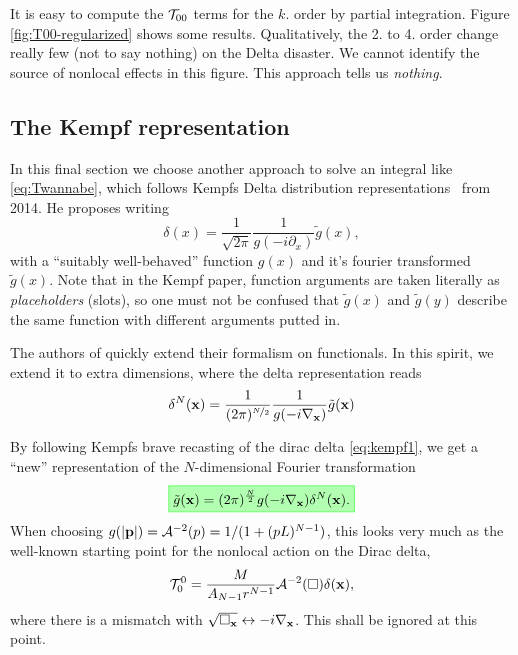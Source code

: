 \documentclass[10pt,a4paper]{article}
\newcommand{\highlight}[1]{%
   \fcolorbox{green}{green!30}{$\displaystyle#1$}%
}
\begin{document}
It is easy to compute the ${\cal T}_{00}$ terms for the $k$. order by partial integration. Figure \ref{fig:T00-regularized} shows some results. Qualitatively, the 2. to 4. order change really few (not to say nothing) on the Delta disaster. We cannot identify the source of nonlocal effects in this figure. This approach tells us \emph{nothing}.

\subsection{The Kempf representation}\label{sec:kempf}
In this final section we choose another approach to solve an integral like \eqref{eq:Twannabe}, which follows Kempfs Delta distribution representations~\cite{Kempf2014} from 2014. He proposes writing
\begin{equation}\label{eq:kempf1}
\delta(x) = \frac{1}{\sqrt{2\pi}} \frac{1}{g(-i\partial_x)} \tilde g(x),
\end{equation}
with a ``suitably well-behaved'' function $g(x)$ and it's fourier transformed $\tilde g(x)$. Note that in the Kempf paper, function arguments are taken literally as \emph{placeholders} (slots), so one must not be confused that $\tilde g(x)$ and $\tilde g(y)$ describe the same function with different arguments putted in.

The authors of \cite{Kempf2014} quickly extend their formalism on functionals. In this spirit, we extend it to extra dimensions, where the delta representation reads
\begin{equation}
\delta^N(\mathbf{ x }) = \frac{1}{(2\pi)^{\nicefrac N2}}
\frac{1}{g(-i \nabla_{\mathbf{ x }})} \tilde g(\mathbf{ x })
\end{equation}

By following Kempfs brave recasting of the dirac delta \eqref{eq:kempf1}, we get a ``new'' representation of the $N$-dimensional Fourier transformation
\begin{equation} \label{eq:gtilde}
\highlight{
\tilde g(\bv x) = (2\pi)^{\frac N2} g(-i\nabla_{\bv x}) \delta^N(\bv x).
}%
\end{equation}
When choosing $g(|\mathbf{ p }|)={\cal A}^{-2}(p)=1/(1+(pL)^{N-1})$, this looks very much as the well-known starting point for the nonlocal action on the Dirac delta,
\begin{equation} \label{eq:T00kempf}
{\cal T}^0_0 = \frac{M}{A_{N-1} r^{N-1}} {\cal A}^{-2}(\square) \delta(\mathbf{ x }),
\end{equation}
where there is a mismatch with $\sqrt{\square_{\mathbf{ x }}} \leftrightarrow -i \nabla_{\mathbf{ x }}$. This shall be ignored at this point.
\end{document}
